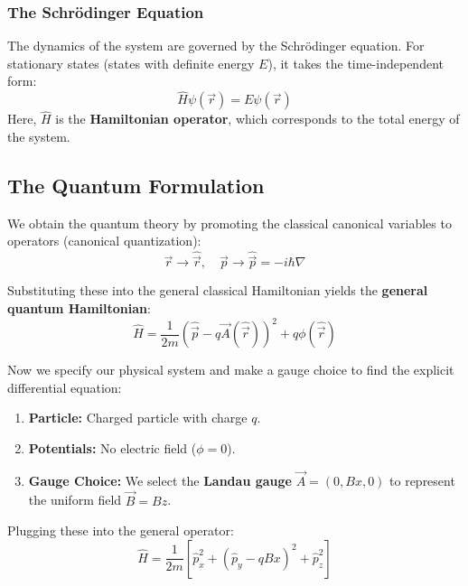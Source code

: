 \documentclass[11pt,a4paper]{article}
\let\oldsubsection\subsection
\renewcommand{\subsection}{\needspace{4\baselineskip}\oldsubsection}
\let\oldsubsubsection\subsubsection
\renewcommand{\subsubsection}{\needspace{3\baselineskip}\oldsubsubsection}
\theoremstyle{definition}
\theoremstyle{remark}
\begin{document}
\subsubsection{The Schrödinger Equation}

The dynamics of the system are governed by the Schrödinger equation. For stationary states (states with definite energy $E$), it takes the time-independent form:
\begin{equation}
    \hat{H}\psi(\vec{r}) = E\psi(\vec{r})
\end{equation}
Here, $\hat{H}$ is the \textbf{Hamiltonian operator}, which corresponds to the total energy of the system.

\subsection{The Quantum Formulation}

We obtain the quantum theory by promoting the classical canonical variables to operators (canonical quantization):
\begin{equation}
    \vec{r} \to \hat{\vec{r}}, \quad \vec{p} \to \hat{\vec{p}} = -i\hbar\nabla
\end{equation}

Substituting these into the general classical Hamiltonian yields the \textbf{general quantum Hamiltonian}:
\begin{equation}
    \hat{H} = \frac{1}{2m}\left(\hat{\vec{p}} - q\vec{A}(\hat{\vec{r}})\right)^2 + q\phi(\hat{\vec{r}})
\end{equation}

Now we specify our physical system and make a gauge choice to find the explicit differential equation:
\begin{enumerate}
    \item \textbf{Particle:} Charged particle with charge $q$.
    \item \textbf{Potentials:} No electric field ($\phi = 0$).
    \item \textbf{Gauge Choice:} We select the \textbf{Landau gauge} $\vec{A} = (0, Bx, 0)$ to represent the uniform field $\vec{B} = B\hat{z}$.
\end{enumerate}

Plugging these into the general operator:
\begin{equation}
    \hat{H} = \frac{1}{2m}\left[ \hat{p}_x^2 + (\hat{p}_y - qBx)^2 + \hat{p}_z^2 \right]
\end{equation}
\end{document}
